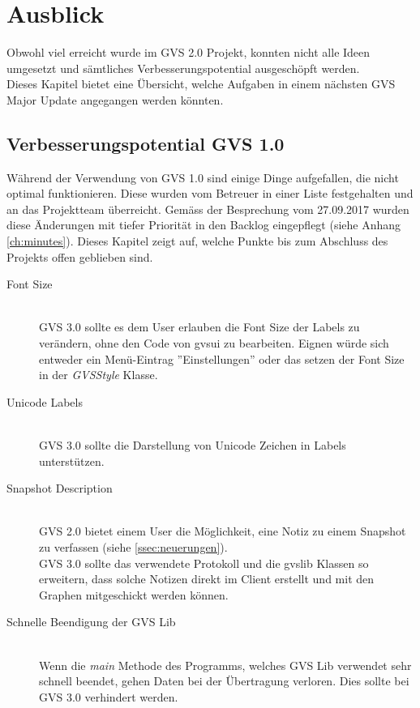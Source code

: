 \documentclass[11pt,a4paper,english,oneside]{book}
\numberwithin{equation}{chapter}
\begin{document}
	\section{Ausblick}
	\label{sec:ausblick}
	Obwohl viel erreicht wurde im GVS 2.0 Projekt, konnten nicht alle Ideen umgesetzt und sämtliches Verbesserungspotential ausgeschöpft werden.\\
	
	\noindent
	Dieses Kapitel bietet eine Übersicht, welche Aufgaben in einem nächsten GVS Major Update angegangen werden könnten. 
	
	\subsection{Verbesserungspotential GVS 1.0}
	Während der Verwendung von GVS 1.0 sind einige Dinge aufgefallen, die nicht optimal funktionieren. Diese wurden vom Betreuer in einer Liste festgehalten und an das Projektteam überreicht. Gemäss der Besprechung vom 27.09.2017 wurden diese Änderungen mit tiefer Priorität in den Backlog eingepflegt (siehe Anhang \ref{ch:minutes}). Dieses Kapitel zeigt auf, welche Punkte bis zum Abschluss des Projekts offen geblieben sind.
	
	\begin{description}
		\item[Font Size] \hfill \\
			GVS 3.0 sollte es dem User erlauben die Font Size der Labels zu verändern, ohne den Code von \gls{gvsui} zu bearbeiten. Eignen würde sich entweder ein Menü-Eintrag ''Einstellungen'' oder das setzen der Font Size in der \textit{GVSStyle} Klasse.
		\item[Unicode Labels] \hfill \\
		GVS 3.0 sollte die Darstellung von Unicode Zeichen in Labels unterstützen.
		\item[Snapshot Description] \hfill \\
			GVS 2.0 bietet einem User die Möglichkeit, eine Notiz zu einem Snapshot zu verfassen (siehe \ref{ssec:neuerungen}).\\
			GVS 3.0 sollte das verwendete Protokoll und die \gls{gvslib} Klassen so erweitern, dass solche Notizen direkt im Client erstellt und mit den Graphen mitgeschickt werden können.
		\item[Schnelle Beendigung der GVS Lib] \hfill \\
			Wenn die \textit{main} Methode des Programms, welches GVS Lib verwendet sehr schnell beendet, gehen Daten bei der Übertragung verloren. Dies sollte bei GVS 3.0 verhindert werden.
	\end{description}
	
\end{document}
